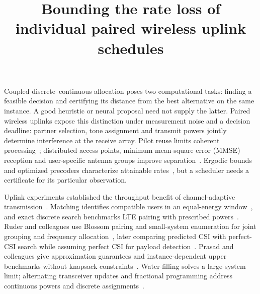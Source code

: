 \documentclass[lineno,pdflatex,sn-nature]{sn-jnl}
\begin{document}
\title{Bounding the rate loss of individual paired wireless uplink schedules}
\author[1]{ }
\author*[1]{ }
\maketitle



Coupled discrete--continuous allocation poses two computational tasks: finding a feasible decision and certifying its distance from the best alternative on the same instance. A good heuristic or neural proposal need not supply the latter. Paired wireless uplinks expose this distinction under measurement noise and a decision deadline: partner selection, tone assignment and transmit powers jointly determine interference at the receive array. Pilot reuse limits coherent processing~\cite{marzetta}; distributed access points, minimum mean-square error (MMSE) reception and user-specific antenna groups improve separation~\cite{ngo,bjornson,demir,buzzi}. Ergodic bounds and optimized precoders characterize attainable rates~\cite{caire,wang}, but a scheduler needs a certificate for its particular observation.

Uplink experiments established the throughput benefit of channel-adaptive transmission~\cite{haustein}. Matching identifies compatible users in an equal-energy window~\cite{viterbo}, and exact discrete search benchmarks LTE pairing with prescribed powers~\cite{fan}. Ruder and colleagues use Blossom pairing and small-system enumeration for joint grouping and frequency allocation~\cite{ruder2013}, later comparing predicted CSI with perfect-CSI search while assuming perfect CSI for payload detection~\cite{ruder2014}. Prasad and colleagues give approximation guarantees and instance-dependent upper benchmarks without knapsack constraints~\cite{prasad}. Water-filling solves a large-system limit; alternating transceiver updates and fractional programming address continuous powers and discrete assignments~\cite{viswanath,shi,shenfpone,shenfptwo}.
\end{document}
